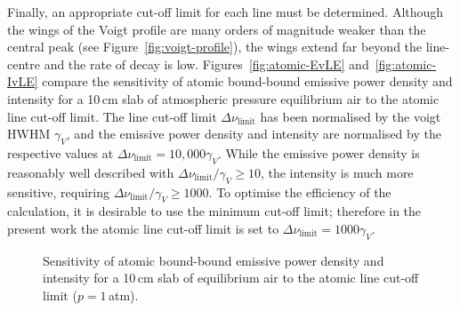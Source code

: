 \par


Finally, an appropriate cut-off limit for each line must be determined.
Although the wings of the Voigt profile are many orders of magnitude weaker than the central peak (see Figure~\ref{fig:voigt-profile}), the wings extend far beyond the line-centre and the rate of decay is low.
Figures~\ref{fig:atomic-EvLE} and~\ref{fig:atomic-IvLE} compare the sensitivity of atomic bound-bound emissive power density and intensity for a 10\,cm slab of atmospheric pressure equilibrium air to the atomic line cut-off limit.
The line cut-off limit $\Delta \nu_\text{limit}$ has been normalised by the voigt HWHM $\gamma_V$, and the emissive power density and intensity are normalised by the respective values at $\Delta \nu_\text{limit} = 10,000 \gamma_V$.
While the emissive power density is reasonably well described with $\Delta \nu_\text{limit} / \gamma_V \geq 10$, the intensity is much more sensitive, requiring $\Delta \nu_\text{limit} / \gamma_V \geq 1000$.
To optimise the efficiency of the calculation, it is desirable to use the minimum cut-off limit; therefore in the present work the atomic line cut-off limit is set to $\Delta \nu_\text{limit} = 1000 \gamma_V$.

\begin{figure}[h]
 \centering
 \caption{Sensitivity of atomic bound-bound emissive power density and intensity for a 10\,cm slab of equilibrium air to the atomic line cut-off limit ($p=1$\,atm).}
 \label{fig:atomic_LE_sensitivity}
\end{figure}


